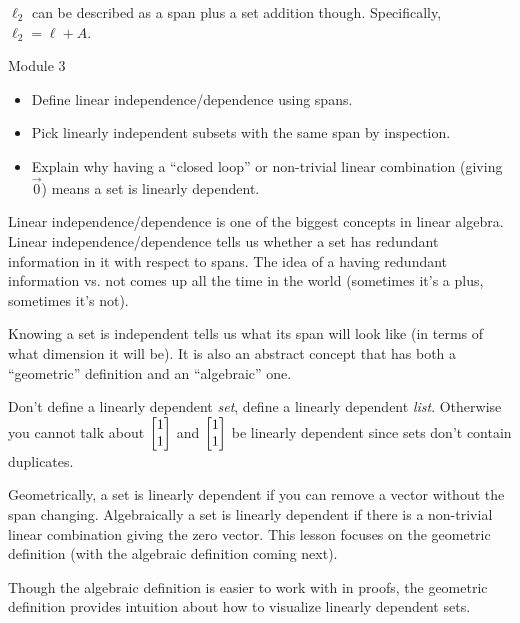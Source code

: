 \documentclass{workbook}
\begin{document}
\begin{slide}
\begin{parts}
\begin{solution}
				$\ell_2$ can be described as a span plus a set addition though.
				Specifically, $\ell_2=\ell + A$.
			\end{solution}
	\end{parts}
\end{slide}
	\begin{bookonly}\begin{center}\doublegrid\end{center}\end{bookonly}


\begin{lesson}

	Module 3

	\begin{itemize}
		\item Define linear independence/dependence using spans.
		\item Pick linearly independent subsets with the same span by inspection.
		\item Explain why having a ``closed loop'' or non-trivial linear combination (giving $\vec 0$)
			means a set is linearly dependent.
	\end{itemize}

	Linear independence/dependence is one of the biggest concepts in linear algebra.
	Linear independence/dependence tells us whether a set has redundant information
	in it with respect to spans. The idea of a having redundant information vs\mbox{.}
	not comes up all the time in the world (sometimes it's a plus, sometimes it's not).

	Knowing
	a set is independent tells us what its span will look like (in terms of what dimension
	it will be). It is also an abstract concept that has both a ``geometric'' definition
	and an ``algebraic'' one.
	\begin{annotation}
		\begin{notes}
			Don't define a linearly dependent \emph{set}, define
			a linearly dependent \emph{list}. Otherwise you cannot talk about
			$\mat{1\\1}$ and $\mat{1\\1}$ be linearly dependent since sets don't
			contain duplicates.
		\end{notes}
	\end{annotation}
	Geometrically, a set is linearly dependent if you can remove
	a vector without the span changing. Algebraically a set is linearly dependent if there
	is a non-trivial linear combination giving the zero vector. This lesson focuses on the
	geometric definition (with the algebraic definition coming next).

	Though the algebraic definition is easier to work with in proofs, the geometric definition
	provides intuition about how to visualize linearly
	dependent sets.

\end{lesson}
\end{document}
